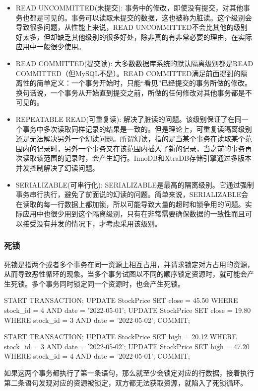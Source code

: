 \begin{itemize}
    \item READ UNCOMMITTED(未提交): 事务中的修改，即使没有提交，对其他事务也都是可见的。事务可以读取未提交的数据，这也被称为脏读。这个级别会导致很多问题，从性能上来说，READ UNCOMMITTED不会比其他的级别好太多，但却缺乏其他级别的很多好处，除非真的有非常必要的理由，在实际应用中一般很少使用。
    \item READ COMMITTED(提交读): 大多数数据库系统的默认隔离级别都是READ COMMITTED（但MySQL不是）。READ COMMITTED满足前面提到的隔离性的简单定义：一个事务开始时，只能“看见”已经提交的事务所做的修改。换句话说，一个事务从开始直到提交之前，所做的任何修改对其他事务都是不可见的。
    \item REPEATABLE READ(可重复读): 解决了脏读的问题。该级别保证了在同一个事务中多次读取同样记录的结果是一致的。但是理论上，可重复读隔离级别还是无法解决另外一个幻读问题。所谓幻读，指的是当某个事务在读取某个范围内的记录时，另外一个事务又在该范围内插入了新的记录，当之前的事务再次读取该范围的记录时，会产生幻行。InnoDB和XtraDB存储引擎通过多版本并发控制解决了幻读问题。
    \item SERIALIZABLE(可串行化): SERIALIZABLE是最高的隔离级别。它通过强制事务串行执行，避免了前面说的幻读的问题。简单来说，SERIALIZABLE会在读取的每一行数据上都加锁，所以可能导致大量的超时和锁争用的问题。实际应用中也很少用到这个隔离级别，只有在非常需要确保数据的一致性而且可以接受没有并发的情况下，才考虑采用该级别。
\end{itemize}

\subsubsection*{死锁}

死锁是指两个或者多个事务在同一资源上相互占用，并请求锁定对方占用的资源，从而导致恶性循环的现象。当多个事务试图以不同的顺序锁定资源时，就可能会产生死锁。多个事务同时锁定同一个资源时，也会产生死锁。

\begin{sql}
START TRANSACTION;
UPDATE StockPrice SET close = 45.50 WHERE stock_id = 4 AND date = '2022-05-01';
UPDATE StockPrice SET close = 19.80 WHERE stock_id = 3 AND date = '2022-05-02';
COMMIT;
    
START TRANSACTION;
UPDATE StockPrice SET high = 20.12 WHERE stock_id = 3 AND date = '2022-05-02';
UPDATE StockPrice SET high = 47.20 WHERE stock_id = 4 AND date = '2022-05-01';
COMMIT;
\end{sql}

如果这两个事务都执行了第一条语句，那么就至少会锁定对应的行数据，接着执行第二条语句发现对应的资源被锁定，双方都无法获取资源，就陷入了死锁循环。

